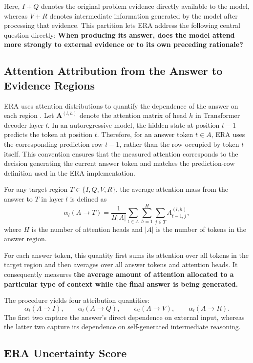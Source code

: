 Here, $I+Q$ denotes the original problem evidence directly available to the model, whereas $V+R$ denotes intermediate information generated by the model after processing that evidence. This partition lets ERA address the following central question directly: \textbf{When producing its answer, does the model attend more strongly to external evidence or to its own preceding rationale?}

\subsection{Attention Attribution from the Answer to Evidence Regions}
\label{subsec:era_attribution}

ERA uses attention distributions to quantify the dependence of the answer on each region \citep{huang2024opera}. Let $\mathbf A^{(l,h)}$ denote the attention matrix of head $h$ in Transformer decoder layer $l$. In an autoregressive model, the hidden state at position $t-1$ predicts the token at position $t$. Therefore, for an answer token $t\in A$, ERA uses the corresponding prediction row $t-1$, rather than the row occupied by token $t$ itself. This convention ensures that the measured attention corresponds to the decision generating the current answer token and matches the prediction-row definition used in the ERA implementation.

For any target region $T\in\{I,Q,V,R\}$, the average attention mass from the answer to $T$ in layer $l$ is defined as
\[
\alpha_l(A\rightarrow T)
=
\frac{1}{H\lvert A\rvert}
\sum_{t\in A}
\sum_{h=1}^{H}
\sum_{j\in T}
A^{(l,h)}_{t-1,j},
\]
where $H$ is the number of attention heads and $\lvert A\rvert$ is the number of tokens in the answer region.

For each answer token, this quantity first sums its attention over all tokens in the target region and then averages over all answer tokens and attention heads. It consequently measures \textbf{the average amount of attention allocated to a particular type of context while the final answer is being generated.}

The procedure yields four attribution quantities:
\[
\alpha_l(A\rightarrow I),\qquad
\alpha_l(A\rightarrow Q),\qquad
\alpha_l(A\rightarrow V),\qquad
\alpha_l(A\rightarrow R).
\]
The first two capture the answer's direct dependence on external input, whereas the latter two capture its dependence on self-generated intermediate reasoning.

\subsection{ERA Uncertainty Score}
\label{subsec:era_score}

